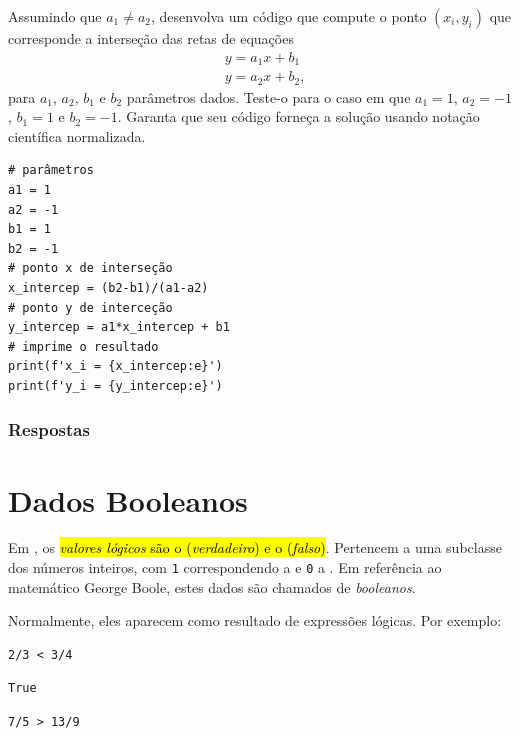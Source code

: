 \begin{exer}
  Assumindo que $a_1\neq a_2$, desenvolva um código {\python} que compute o ponto $(x_{i}, y_i)$ que corresponde a interseção das retas de equações
  \begin{align}
    & y = a_1x + b_1 \\
    & y = a_2x + b_2,
  \end{align}
  para $a_1$, $a_2$, $b_1$ e $b_2$ parâmetros dados. Teste-o para o caso em que $a_1=1$, $a_2=-1$, $b_1=1$ e $b_2=-1$. Garanta que seu código forneça a solução usando notação científica normalizada.
\end{exer}
\begin{resp}

\begin{lstlisting}
# parâmetros
a1 = 1
a2 = -1
b1 = 1
b2 = -1
# ponto x de interseção
x_intercep = (b2-b1)/(a1-a2)
# ponto y de interceção
y_intercep = a1*x_intercep + b1
# imprime o resultado
print(f'x_i = {x_intercep:e}')
print(f'y_i = {y_intercep:e}')
\end{lstlisting}

\end{resp}

\ifisbook
\subsubsection{Respostas}
\shipoutAnswer
\fi

\section{Dados Booleanos}\label{cap_lingua_sec_bool}

Em {\python}, os \hl{\emph{valores lógicos} são o {\PYTHONTrue} (\emph{verdadeiro}) e o {\PYTHONFalse} (\emph{falso})}. Pertencem a uma subclasse dos números inteiros, com \lstinline+1+ correspondendo a {\PYTHONTrue} e \lstinline+0+ a {\PYTHONFalse}. Em referência ao matemático George Boole{\boole}, estes dados são chamados de \emph{booleanos}.

Normalmente, eles aparecem como resultado de expressões lógicas. Por exemplo:

\begin{lstlisting}
2/3 < 3/4
\end{lstlisting}

\begin{verbatim}
True
\end{verbatim}

\begin{lstlisting}
7/5 > 13/9
\end{lstlisting}

